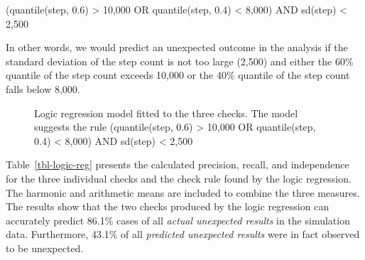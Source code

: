 \documentclass[
  12pt,
]{interact}
\begin{document}
(quantile(step, 0.6) \textgreater{} 10,000 OR quantile(step, 0.4)
\textless{} 8,000) AND sd(step) \textless{} 2,500

In other words, we would predict an unexpected outcome in the analysis
if the standard deviation of the step count is not too large (2,500) and
either the 60\% quantile of the step count exceeds 10,000 or the 40\%
quantile of the step count falls below 8,000.

\label{cell-fig-logic-reg}
\begin{figure}[H]


\caption{\label{fig-logic-reg}Logic regression model fitted to the three
checks. The model suggests the rule (quantile(step, 0.6) \textgreater{}
10,000 OR quantile(step, 0.4) \textless{} 8,000) AND sd(step)
\textless{} 2,500}

\end{figure}%

Table~\ref{tbl-logic-reg} presents the calculated precision, recall, and
independence for the three individual checks and the check rule found by
the logic regression. The harmonic and arithmetic means are included to
combine the three measures. The results show that the two checks
produced by the logic regression can accurately predict 86.1\% cases of
all \emph{actual unexpected results} in the simulation data.
Furthermore, 43.1\% of all \emph{predicted unexpected results} were in
fact observed to be unexpected.
\end{document}
